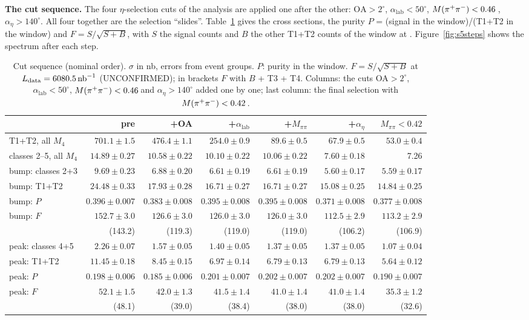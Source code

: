 \textbf{The cut sequence.} The four $\eta$-selection cuts of the analysis are applied one after
the other: $\mathrm{OA}>2^\circ$, $\alpha_{\mathrm{lab}}<50^\circ$, $M(\pi^{+}\pi^{-})<0.46$\,\GeVcc,
$\alpha_\eta>140^\circ$. All four together are the selection ``slides''.
Table~\ref{tab:s5flow} gives the cross sections, the purity $P$ = (signal in the window)/(T1+T2 in
the window) and $F = S/\sqrt{S+B}$, with $S$ the signal counts and $B$ the other T1+T2 counts of the
window at \Ldata. Figure~\ref{fig:s5steps} shows the spectrum after each step.

\begin{table}[H]
\centering
\caption{Cut sequence (nominal order). $\sigma$ in nb, errors from event groups. $P$: purity in
the window. $F = S/\sqrt{S+B}$ at $L_{\mathrm{data}} = 6080.5\,\mathrm{nb}^{-1}$ (UNCONFIRMED); in brackets $F$ with
$B$ + T3 + T4. Columns: the cuts OA$>2^\circ$, $\alpha_{\mathrm{lab}}<50^\circ$, $M(\pi^{+}\pi^{-})<0.46$\,\GeVcc and
$\alpha_\eta>140^\circ$ added one by one; last column: the final selection with $M(\pi^{+}\pi^{-})<0.42$\,\GeVcc.}
\label{tab:s5flow}
\footnotesize
\setlength{\tabcolsep}{3pt}
\begin{tabular}{@{}l rrrrr r@{}}
\toprule
 & pre & +OA & +$\alpha_{\mathrm{lab}}$ & +$M_{\pi\pi}$ & +$\alpha_\eta$ & $M_{\pi\pi}<0.42$ \\
\midrule
T1+T2, all $M_4$        & $701.1\pm1.5$ & $476.4\pm1.1$ & $254.0\pm0.9$ & $89.6\pm0.5$ & $67.9\pm0.5$ & $53.0\pm0.4$ \\
classes 2--5, all $M_4$ & $14.89\pm0.27$ & $10.58\pm0.22$ & $10.10\pm0.22$ & $10.06\pm0.22$ & $7.60\pm0.18$ & 7.26 \\
\midrule
bump: classes 2+3      & $9.69\pm0.23$ & $6.88\pm0.20$ & $6.61\pm0.19$ & $6.61\pm0.19$ & $5.60\pm0.17$ & $5.59\pm0.17$ \\
bump: T1+T2            & $24.48\pm0.33$ & $17.93\pm0.28$ & $16.71\pm0.27$ & $16.71\pm0.27$ & $15.08\pm0.25$ & $14.84\pm0.25$ \\
bump: $P$              & $0.396\pm0.007$ & $0.383\pm0.008$ & $0.395\pm0.008$ & $0.395\pm0.008$ & $0.371\pm0.008$ & $0.377\pm0.008$ \\
bump: $F$              & $152.7\pm3.0$ & $126.6\pm3.0$ & $126.0\pm3.0$ & $126.0\pm3.0$ & $112.5\pm2.9$ & $113.2\pm2.9$ \\
                       & (143.2) & (119.3) & (119.0) & (119.0) & (106.2) & (106.9) \\
\midrule
peak: classes 4+5      & $2.26\pm0.07$ & $1.57\pm0.05$ & $1.40\pm0.05$ & $1.37\pm0.05$ & $1.37\pm0.05$ & $1.07\pm0.04$ \\
peak: T1+T2            & $11.45\pm0.18$ & $8.45\pm0.15$ & $6.97\pm0.14$ & $6.79\pm0.13$ & $6.79\pm0.13$ & $5.64\pm0.12$ \\
peak: $P$              & $0.198\pm0.006$ & $0.185\pm0.006$ & $0.201\pm0.007$ & $0.202\pm0.007$ & $0.202\pm0.007$ & $0.190\pm0.007$ \\
peak: $F$              & $52.1\pm1.5$ & $42.0\pm1.3$ & $41.5\pm1.4$ & $41.0\pm1.4$ & $41.0\pm1.4$ & $35.3\pm1.2$ \\
                       & (48.1) & (39.0) & (38.4) & (38.0) & (38.0) & (32.6) \\
\bottomrule
\end{tabular}
\end{table}
